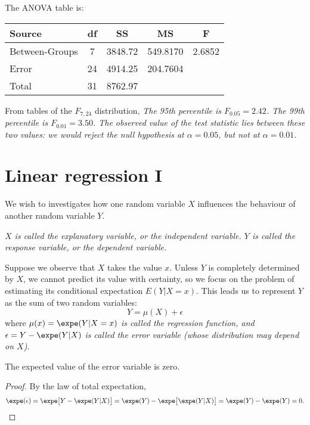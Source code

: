 \begin{solution}
The ANOVA table is:
\begin{center}
\begin{tabular}{|l|c|c|c|c|} \hline
Source			& df	& SS		& MS		& F 			\\ \hline
Between-Groups	& 7		& 3848.72	& 549.8170	& 2.6852		\\ \hline
Error			& 24	& 4914.25	& 204.7604 	& 			\\ \hline
Total			& 31	& 8762.97 	& 			&			\\ \hline
\end{tabular}\par
\end{center}

From tables of the $F_{7,24}$ distribution, 
\bit
\it The 95th percentile is $F_{0.05} = 2.42$.
\it The 99th percentile is $F_{0.01} = 3.50$.
\eit
The observed value of the test statistic lies between these two values: we would reject the null hypothesis at $\alpha=0.05$, but not at $\alpha=0.01$.
\end{solution}


\section{Linear regression I}\label{sec:slr1}

We wish to investigates how one random variable $X$ influences the behaviour of another random variable $Y$.

\bit
\it $X$ is called the \emph{explanatory variable}, or the \emph{independent} variable.
\it $Y$ is called the \emph{response variable}, or the \emph{dependent} variable.
\eit

Suppose we observe that $X$ takes the value $x$. Unless $Y$ is completely determined by $X$, we cannot predict its value with certainty, so we focus on the problem of estimating its conditional expectation $E(Y|X=x)$. This leads us to represent $Y$ as the sum of two random variables:
\[
Y = \mu(X) + \epsilon
\]
where 
\bit
\it $\mu(x) = \expe(Y|X=x)$ is called the \emph{regression function}, and
\it $\epsilon = Y - \expe(Y|X)$ is called the \emph{error variable} (whose distribution may depend on $X$).
\eit
 
\begin{lemma}
The expected value of the error variable is zero.
\end{lemma}
\begin{proof}
By the law of total expectation, 
\[
\expe(\epsilon) = \expe\big[Y - \expe(Y|X)\big] = \expe(Y) - \expe\big[\expe(Y|X)\big] = \expe(Y)-\expe(Y) = 0.
\]
\end{proof}

